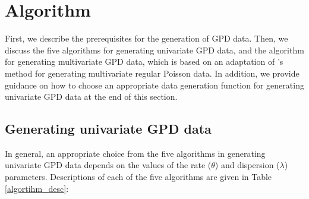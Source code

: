 \section{Algorithm}

First, we describe the prerequisites for the generation of GPD data. Then, we discuss the five algorithms for generating univariate GPD data, and the algorithm for generating multivariate GPD data, which is based on an adaptation of \cite{yahav2012generating}'s method for generating multivariate regular Poisson data. In addition, we provide guidance on how to choose an appropriate data generation function for generating univariate GPD data at the end of this section.

\subsection{Generating univariate GPD data}

In general, an appropriate choice from the five algorithms in generating univariate GPD data depends on the values of the rate ($\theta$) and dispersion ($\lambda$) parameters. Descriptions of each of the five algorithms \citep{hakan} are given in Table \ref{algortihm_desc}:  

